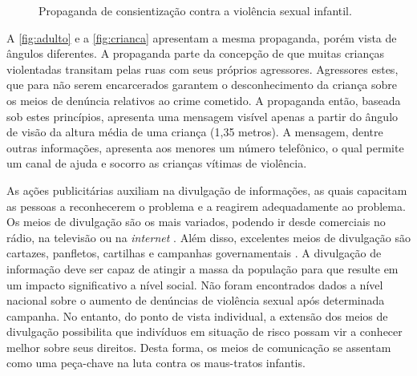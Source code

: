 \begin{figure}[htb]%
  \centering
  \caption{\label{fig:ad}Propaganda de consientização contra a violência sexual infantil.}%
  \hspace{0.01cm}
  \vspace{10pt}
  \label{fig:example}%
\end{figure}

A \autoref{fig:adulto} e a \autoref{fig:crianca} apresentam a mesma propaganda, porém vista de ângulos diferentes. A propaganda parte da concepção de que muitas crianças violentadas transitam pelas ruas com seus próprios agressores. Agressores estes, que para não serem encarcerados garantem o desconhecimento da criança sobre os meios de denúncia relativos ao crime cometido. A propaganda então, baseada sob estes princípios, apresenta uma mensagem visível apenas a partir do ângulo de visão da altura média de uma criança (1,35 metros). A mensagem, dentre outras informações, apresenta aos menores um número telefônico, o qual permite um canal de ajuda e socorro as crianças vítimas de violência. 

As ações publicitárias auxiliam na divulgação de informações, as quais capacitam as pessoas a reconhecerem o problema e a reagirem adequadamente ao problema. Os meios de divulgação são os mais variados, podendo ir desde comerciais no rádio, na televisão ou na \textit{internet} \cite{martinez2000prevencion}. Além disso, excelentes meios de divulgação são cartazes, panfletos, cartilhas e campanhas governamentais \cite{mendelson2015parent}. A divulgação de informação deve ser capaz de atingir a massa da população para que resulte em um impacto significativo a nível social. Não foram encontrados dados a nível nacional sobre o aumento de denúncias de violência sexual após determinada campanha. No entanto, do ponto de vista individual, a extensão dos meios de divulgação possibilita que indivíduos em situação de risco possam vir a conhecer melhor sobre seus direitos. Desta forma, os meios de comunicação se assentam como uma peça-chave na luta contra os maus-tratos infantis. 

